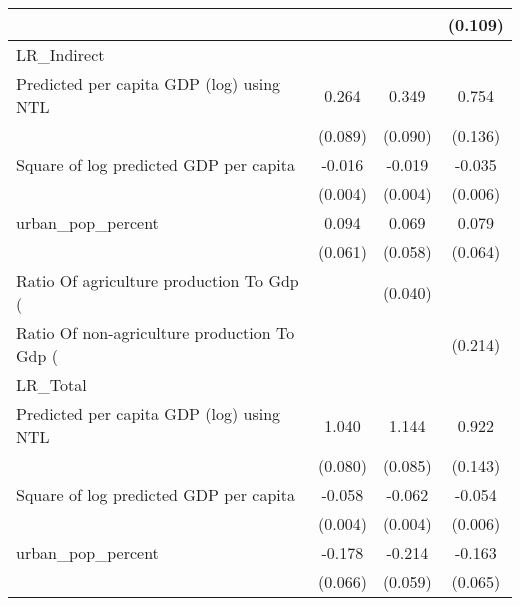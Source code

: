 {\begin{tabular}{l*{3}{c}}
                    &                     &                     &     (0.109)         \\
\hline
LR\_Indirect         &                     &                     &                     \\
Predicted per capita GDP (log) using NTL&       0.264\sym{***}&       0.349\sym{***}&       0.754\sym{***}\\
                    &     (0.089)         &     (0.090)         &     (0.136)         \\
[1em]
Square of log predicted GDP per capita&      -0.016\sym{***}&      -0.019\sym{***}&      -0.035\sym{***}\\
                    &     (0.004)         &     (0.004)         &     (0.006)         \\
[1em]
urban\_pop\_percent   &       0.094         &       0.069         &       0.079         \\
                    &     (0.061)         &     (0.058)         &     (0.064)         \\
[1em]
Ratio Of agriculture production To Gdp (%
                    &                     &     (0.040)         &                     \\
[1em]
Ratio Of non-agriculture production To Gdp (%
                    &                     &                     &     (0.214)         \\
\hline
LR\_Total            &                     &                     &                     \\
Predicted per capita GDP (log) using NTL&       1.040\sym{***}&       1.144\sym{***}&       0.922\sym{***}\\
                    &     (0.080)         &     (0.085)         &     (0.143)         \\
[1em]
Square of log predicted GDP per capita&      -0.058\sym{***}&      -0.062\sym{***}&      -0.054\sym{***}\\
                    &     (0.004)         &     (0.004)         &     (0.006)         \\
[1em]
urban\_pop\_percent   &      -0.178\sym{***}&      -0.214\sym{***}&      -0.163\sym{**} \\
                    &     (0.066)         &     (0.059)         &     (0.065)         \\

\end{tabular}}
